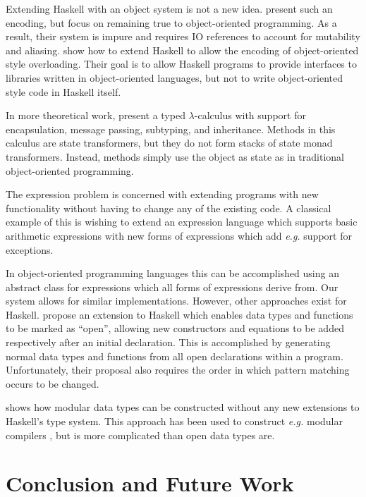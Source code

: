 \documentclass[runningheads,a4paper]{llncs}
\begin{document}

Extending Haskell with an object system is not a new idea. \cite{OOHaskell} present such an encoding, but focus on remaining true to object-oriented programming. As a result, their system is impure and requires IO references to account for mutability and aliasing. \cite{shields2001object} show how to extend Haskell to allow the encoding of object-oriented style overloading. Their goal is to allow Haskell programs to provide interfaces to libraries written in object-oriented languages, but not to write object-oriented style code in Haskell itself.

In more theoretical work, \cite{Pierce93simpletype-theoretic} present a typed $\lambda$-calculus with support for encapsulation, message passing, subtyping, and inheritance. Methods in this calculus are state transformers, but they do not form stacks of state monad transformers. Instead, methods simply use the object as state as in traditional object-oriented programming.

The expression problem \cite{wadler1998expression} is concerned with extending programs with new functionality without having to change any of the existing code. A classical example of this is wishing to extend an expression language which supports basic arithmetic expressions with new forms of expressions which add \emph{e.g.} support for exceptions.  

In object-oriented programming languages this can be accomplished using an abstract class for expressions which all forms of expressions derive from. Our system allows for similar implementations. However, other approaches exist for Haskell. \cite{loh2006open} propose an extension to Haskell which enables data types and functions to be marked as ``open'', allowing new constructors and equations to be added respectively after an initial declaration. This is accomplished by generating normal data types and functions from all open declarations within a program. Unfortunately, their proposal also requires the order in which pattern matching occurs to be changed.

\cite{swierstra2008data} shows how modular data types can be constructed without any new extensions to Haskell's type system. This approach has been used to construct \emph{e.g.} modular compilers \cite{day2012towards}, but is more complicated than open data types are. 

\section{Conclusion and Future Work}
\label{sec:conclusions}
\end{document}
